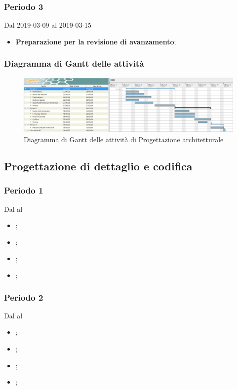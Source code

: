 \subsubsection{Periodo 3} 
Dal 2019-03-09 al 2019-03-15
\begin{itemize}
	\item \textbf{Preparazione per la revisione di avanzamento};
\end{itemize}
\subsubsection{Diagramma di Gantt delle attività}
\begin{figure}[h]
	\includegraphics[scale=0.45]{sezioni/DiagrammiGantt/RP.png}
	\caption{Diagramma di Gantt delle attività di Progettazione architetturale}
\end{figure}

\subsection{Progettazione di dettaglio e codifica}

\subsubsection{Periodo 1} 
Dal al
\begin{itemize}
	\item \textbf{};
	\item \textbf{};
	\item \textbf{};
	\item \textbf{};
\end{itemize}
\subsubsection{Periodo 2} 
Dal al
\begin{itemize}
	\item \textbf{};
	\item \textbf{};
	\item \textbf{};
	\item \textbf{};
\end{itemize}
